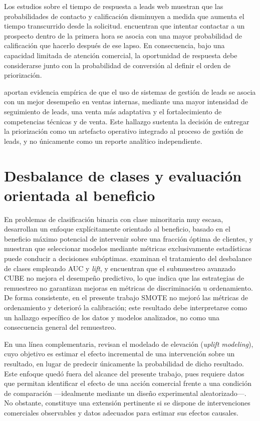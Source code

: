 Los estudios sobre el tiempo de respuesta a leads web muestran que las
probabilidades de contacto y calificación disminuyen a medida que aumenta el tiempo
transcurrido desde la solicitud.  encuentran que intentar
contactar a un prospecto dentro de la primera hora se asocia con una mayor
probabilidad de calificación que hacerlo después de ese lapso. En consecuencia, bajo
una capacidad limitada de atención comercial, la oportunidad de respuesta debe
considerarse junto con la probabilidad de conversión al definir el orden de
priorización.

 aportan evidencia empírica de que el uso de sistemas de
gestión de leads se asocia con un mejor desempeño en ventas internas, mediante una
mayor intensidad de seguimiento de leads, una venta más adaptativa y el
fortalecimiento de competencias técnicas y de venta. Este hallazgo sustenta la
decisión de entregar la priorización como un artefacto operativo integrado al
proceso de gestión de leads, y no únicamente como un reporte analítico
independiente.

\section{Desbalance de clases y evaluación orientada al beneficio}

En problemas de clasificación binaria con clase minoritaria muy escasa,
 desarrollan un enfoque explícitamente orientado al
beneficio, basado en el beneficio máximo potencial de intervenir sobre una fracción
óptima de clientes, y muestran que seleccionar modelos mediante métricas
exclusivamente estadísticas puede conducir a decisiones subóptimas.
 examinan el tratamiento del desbalance de clases
empleando AUC y \emph{lift}, y encuentran que el submuestreo avanzado CUBE no
mejora el desempeño predictivo, lo que indica que las estrategias de remuestreo no
garantizan mejoras en métricas de discriminación u ordenamiento. De forma
consistente, en el presente trabajo SMOTE no mejoró las métricas de ordenamiento y
deterioró la calibración; este resultado debe interpretarse como un hallazgo
específico de los datos y modelos analizados, no como una consecuencia general del
remuestreo.

En una línea complementaria,  revisan el modelado de
elevación (\emph{uplift modeling}), cuyo objetivo es estimar el efecto incremental
de una intervención sobre un resultado, en lugar de predecir únicamente la
probabilidad de dicho resultado. Este enfoque quedó fuera del alcance del presente
trabajo, pues requiere datos que permitan identificar el efecto de una acción
comercial frente a una condición de comparación —idealmente mediante un diseño
experimental aleatorizado—. No obstante, constituye una extensión pertinente si se
dispone de intervenciones comerciales observables y datos adecuados para estimar sus
efectos causales.

